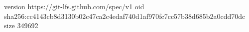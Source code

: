 version https://git-lfs.github.com/spec/v1
oid sha256:cc4143cb8d3130b02c47ca2c4edaf740d1af970fc7cc57b38d685b2a0cdd70dc
size 349692
